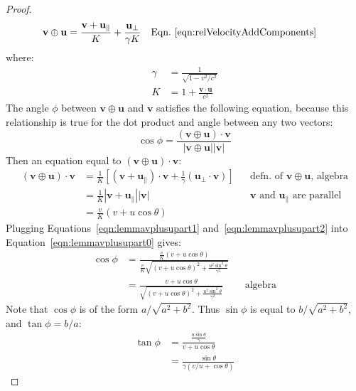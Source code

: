\documentclass[a4paper]{article}
\theoremstyle{plain}
\theoremstyle{definition}
\newcommand{\vect}[1]{\mathbf{#1}}
\begin{document}
\begin{proof}
\begin{align*}
\vect{v} \oplus \vect{u}
  & = \frac{ \vect{v} + \vect{u}_{\parallel} }{K} + \frac{\vect{u}_{\perp}}{\gamma K} & & \text{Eqn.~\eqref{eqn:relVelocityAddComponents}}
\end{align*}
where:
\begin{align*}
\gamma & = \frac{1}{\sqrt{1 - v^2/c^2}} \\
K & = 1 + \frac{\vect{v} \cdot \vect{u}}{c^2}
\end{align*}
The angle $\phi$ between $\vect{v} \oplus \vect{u}$ and $\vect{v}$
satisfies the following equation, because this relationship is true
for the dot product and angle between any two vectors:
\begin{equation}
\cos \phi = \frac{(\vect{v} \oplus \vect{u}) \cdot \vect{v}}{|\vect{v} \oplus \vect{u}| |\vect{v}|} \label{eqn:lemmavplusupart0}
\end{equation}
Then an equation equal to $(\vect{v} \oplus \vect{u}) \cdot \vect{v}$:
\begin{align}
(\vect{v} \oplus \vect{u}) \cdot \vect{v}
  & = \frac{1}{K} \left[ (\vect{v} + \vect{u}_{\parallel}) \cdot \vect{v} + \frac{1}{\gamma} (\vect{u}_{\perp} \cdot \vect{v}) \right] & & \text{defn. of $\vect{v} \oplus \vect{u}$, algebra} \nonumber \\
  & = \frac{1}{K} |\vect{v} + \vect{u}_{\parallel}| |\vect{v}| & & \text{$\vect{v}$ and $\vect{u}_{\parallel}$ are parallel} \nonumber \\
  & = \frac{v}{K} (v + u \cos \theta) \label{eqn:lemmavplusupart2}
\end{align}
Plugging Equations~\eqref{eqn:lemmavplusupart1}
and~\eqref{eqn:lemmavplusupart2}
into Equation~\eqref{eqn:lemmavplusupart0} gives:
\begin{align*}
\cos \phi
  & = \frac{ \frac{v}{K} (v + u \cos \theta) }{ \frac{v}{K} \sqrt{ (v + u \cos \theta)^2 + \frac{u^2 \sin^2 \theta}{\gamma^2} } } \\
  & = \frac{ v + u \cos \theta }{ \sqrt{ (v + u \cos \theta)^2 + \frac{u^2 \sin^2 \theta}{\gamma^2} } } & & \text{algebra}
\end{align*}
Note that $\cos \phi$ is of the form $a / \sqrt{a^2 + b^2}$.
Thus $\sin \phi$ is equal to $b/ \sqrt{a^2 + b^2}$,
and $\tan \phi = b/a$:
\begin{align}
\tan \phi
  & = \frac{ \frac{u \sin \theta}{\gamma} }{ v + u \cos \theta } \nonumber \\
  & = \frac{ \sin \theta }{ \gamma (v/u + \cos \theta) }
\end{align}
\end{proof}
\end{document}
